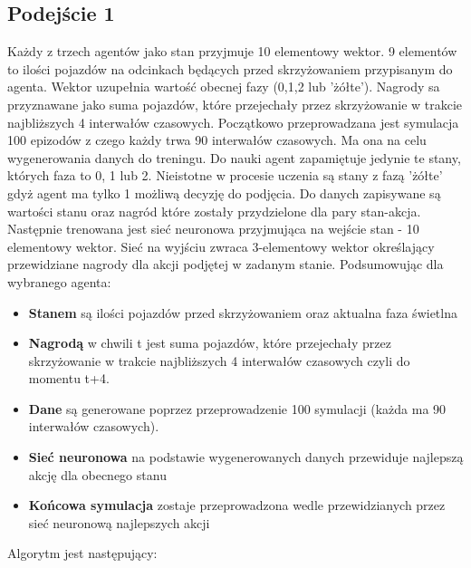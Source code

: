 \documentclass[12pt]{book}
\theoremstyle{plain}
\begin{document}
\subsection{Podejście 1}
Każdy z trzech agentów jako stan przyjmuje 10 elementowy wektor. 9 elementów to ilości pojazdów na odcinkach będących przed skrzyżowaniem przypisanym do agenta. Wektor uzupełnia wartość obecnej fazy (0,1,2 lub 'żółte'). 
Nagrody sa przyznawane jako suma pojazdów, które przejechały przez skrzyżowanie w trakcie najbliższych 4 interwałów czasowych. Początkowo przeprowadzana jest symulacja 100 epizodów z czego każdy trwa 90 interwałów czasowych. Ma ona na celu wygenerowania danych do treningu. Do nauki agent zapamiętuje jedynie te stany, których faza to 0, 1 lub 2. Nieistotne w procesie uczenia są stany z fazą 'żółte' gdyż agent ma tylko 1 możliwą decyzję do podjęcia. Do danych zapisywane są wartości stanu oraz nagród które zostały przydzielone dla pary stan-akcja. Następnie trenowana jest sieć neuronowa przyjmująca na wejście stan - 10 elementowy wektor. Sieć na wyjściu zwraca 3-elementowy wektor określający przewidziane nagrody dla akcji podjętej w zadanym stanie.
Podsumowując dla wybranego agenta:
\begin{itemize}
	\item \textbf{Stanem} są ilości pojazdów przed skrzyżowaniem oraz aktualna faza świetlna
	\item \textbf{Nagrodą} w chwili t jest suma pojazdów, które przejechały przez skrzyżowanie w trakcie najbliższych 4 interwałów czasowych czyli do momentu t+4.
	\item \textbf{Dane} są generowane poprzez przeprowadzenie 100 symulacji (każda ma 90 interwałów czasowych).
	\item \textbf{Sieć neuronowa} na podstawie wygenerowanych danych przewiduje najlepszą akcję dla obecnego stanu
	\item \textbf{Końcowa symulacja} zostaje przeprowadzona wedle przewidzianych przez sieć neuronową najlepszych akcji
\end{itemize}


Algorytm jest następujący:
\end{document}
